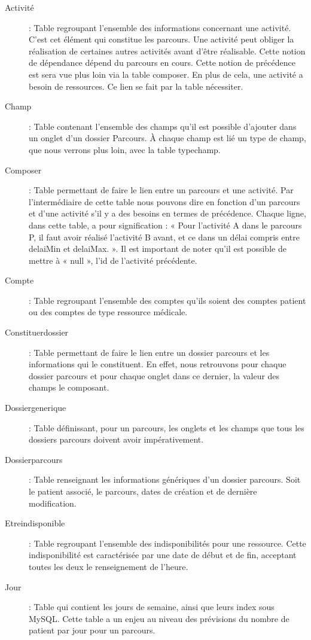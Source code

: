 \documentclass{polytech/polytech}
\begin{document}
\begin{description}
	\item[Activité] : Table regroupant l'ensemble des informations concernant une activité. C'est cet élément qui constitue les parcours. Une activité peut obliger la réalisation de certaines autres activités avant d'être réalisable. Cette notion de dépendance dépend du parcours en cours. Cette notion de précédence est sera vue plus loin via la table composer. En plus de cela, une activité a besoin de ressources. Ce lien se fait par la table nécessiter.
	\item[Champ] : Table contenant l'ensemble des champs qu'il est possible d'ajouter dans un onglet d'un dossier Parcours. À chaque champ est lié un type de champ, que nous verrons plus loin, avec la table typechamp.
	\item[Composer] : Table permettant de faire le lien entre un parcours et une activité. Par l'intermédiaire de cette table nous pouvons dire en fonction d'un parcours et d'une activité s'il y a des besoins en termes de précédence. Chaque ligne, dans cette table, a pour signification : « Pour l'activité A dans le parcours P, il faut avoir réalisé l'activité B avant, et ce dans un délai compris entre delaiMin et delaiMax. ». Il est important de noter qu'il est possible de mettre à « null », l'id de l'activité précédente.
	\item[Compte] : Table regroupant l'ensemble des comptes qu'ils soient des comptes patient ou des comptes de type ressource médicale.
	\item[Constituerdossier] : Table permettant de faire le lien entre un dossier parcours et les informations qui le constituent. En effet, nous retrouvons pour chaque dossier parcours et pour chaque onglet dans ce dernier, la valeur des champs le composant.
	\item[Dossiergenerique] : Table définissant, pour un parcours, les onglets et les champs que tous les dossiers parcours doivent avoir impérativement.
	\item[Dossierparcours] : Table renseignant les informations génériques d'un dossier parcours. Soit le patient associé, le parcours, dates de création et de dernière modification.
	\item[Etreindisponible] : Table regroupant l'ensemble des indisponibilités pour une ressource. Cette indisponibilité est caractérisée par une date de début et de fin, acceptant toutes les deux le renseignement de l'heure.
	\item[Jour] : Table qui contient les jours de semaine, ainsi que leurs index sous MySQL. Cette table a un enjeu au niveau des prévisions du nombre de patient par jour pour un parcours.

\end{description}
\end{document}
